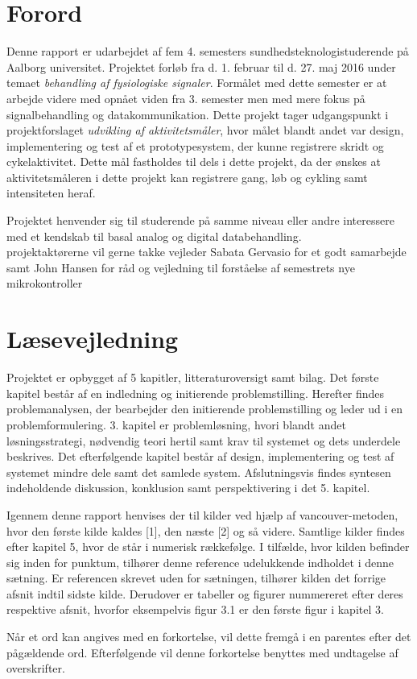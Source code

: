 \section*{Forord}
Denne rapport er udarbejdet af fem 4. semesters sundhedsteknologistuderende på Aalborg universitet. Projektet forløb fra d. 1. februar til d. 27. maj 2016 under temaet \textit{behandling af fysiologiske signaler}. Formålet med dette semester er at arbejde videre med opnået viden fra 3. semester men med mere fokus på signalbehandling og datakommunikation. Dette projekt tager udgangspunkt i projektforslaget \textit{udvikling af aktivitetsmåler}, hvor målet blandt andet var design, implementering og test af et prototypesystem, der kunne registrere skridt og cykelaktivitet. Dette mål fastholdes til dels i dette projekt, da der ønskes at aktivitetsmåleren i dette projekt kan registrere gang, løb og cykling samt intensiteten heraf.

Projektet henvender sig til studerende på samme niveau eller andre interessere med et kendskab til basal analog og digital databehandling. \\
projektaktørerne vil gerne takke vejleder Sabata Gervasio for et godt samarbejde samt John Hansen for råd og vejledning til forståelse af semestrets nye mikrokontroller

\section*{Læsevejledning}
Projektet er opbygget af 5 kapitler, litteraturoversigt samt bilag. Det første kapitel består af en indledning og initierende problemstilling. Herefter findes problemanalysen, der bearbejder den initierende problemstilling og leder ud i en problemformulering. 3. kapitel er problemløsning, hvori blandt andet løsningsstrategi, nødvendig teori hertil samt krav til systemet og dets underdele beskrives. Det efterfølgende kapitel består af design, implementering og test af systemet mindre dele samt det samlede system. Afslutningsvis findes syntesen indeholdende diskussion, konklusion samt perspektivering i det 5. kapitel.

Igennem denne rapport henvises der til kilder ved hjælp af vancouver-metoden, hvor den første kilde kaldes [1], den næste [2] og så videre. Samtlige kilder findes efter kapitel 5, hvor de står i numerisk rækkefølge. I tilfælde, hvor kilden befinder sig inden for punktum, tilhører denne reference udelukkende indholdet i denne sætning. Er referencen skrevet uden for sætningen, tilhører kilden det forrige afsnit indtil sidste kilde. Derudover er tabeller og figurer nummereret efter deres respektive afsnit, hvorfor eksempelvis figur 3.1 er den første figur i kapitel 3.

Når et ord kan angives med en forkortelse, vil dette fremgå i en parentes efter det pågældende ord. Efterfølgende vil denne forkortelse benyttes med undtagelse af overskrifter. 